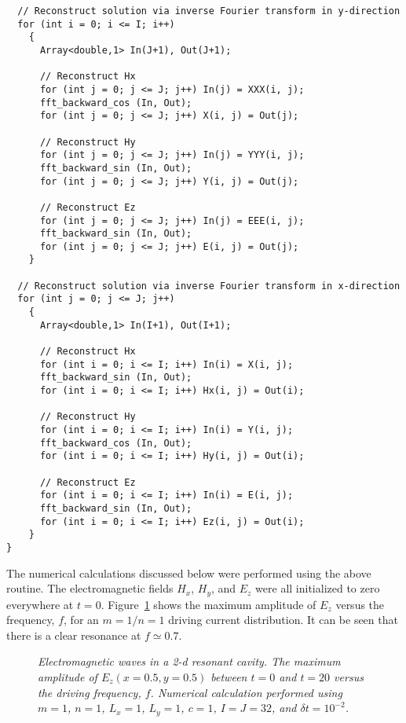 {\begin{verbatim}
  // Reconstruct solution via inverse Fourier transform in y-direction
  for (int i = 0; i <= I; i++)
    {
      Array<double,1> In(J+1), Out(J+1);

      // Reconstruct Hx
      for (int j = 0; j <= J; j++) In(j) = XXX(i, j);
      fft_backward_cos (In, Out);
      for (int j = 0; j <= J; j++) X(i, j) = Out(j);

      // Reconstruct Hy
      for (int j = 0; j <= J; j++) In(j) = YYY(i, j);
      fft_backward_sin (In, Out);
      for (int j = 0; j <= J; j++) Y(i, j) = Out(j);

      // Reconstruct Ez
      for (int j = 0; j <= J; j++) In(j) = EEE(i, j);
      fft_backward_sin (In, Out);
      for (int j = 0; j <= J; j++) E(i, j) = Out(j);
    } 

  // Reconstruct solution via inverse Fourier transform in x-direction
  for (int j = 0; j <= J; j++)
    {
      Array<double,1> In(I+1), Out(I+1);

      // Reconstruct Hx
      for (int i = 0; i <= I; i++) In(i) = X(i, j);
      fft_backward_sin (In, Out);
      for (int i = 0; i <= I; i++) Hx(i, j) = Out(i);

      // Reconstruct Hy
      for (int i = 0; i <= I; i++) In(i) = Y(i, j);
      fft_backward_cos (In, Out);
      for (int i = 0; i <= I; i++) Hy(i, j) = Out(i);

      // Reconstruct Ez
      for (int i = 0; i <= I; i++) In(i) = E(i, j);
      fft_backward_sin (In, Out);
      for (int i = 0; i <= I; i++) Ez(i, j) = Out(i);
    }
}
\end{verbatim}}

The numerical calculations discussed below were performed
using the above routine. The electromagnetic
fields $H_x$, $H_y$, and $E_z$ were all initialized to zero everywhere  at $t=0$.
 Figure~\ref{fcavity1} shows the maximum
amplitude of $E_z$ versus the frequency, $f$, for an $m=1/n=1$ driving
current distribution. It can
be seen that there is a clear resonance at $f\simeq 0.7$. 

\begin{figure}
\epsfysize=3in
\centerline{}
\caption{\em Electromagnetic waves in a 2-d resonant cavity.
The maximum amplitude of $E_z(x=0.5,y=0.5)$ between $t=0$ and $t=20$ versus the driving frequency, $f$.
Numerical calculation performed using  $m=1$, $n=1$, $L_x=1$, $L_y=1$, $c=1$,
$I=J=32$, and $\delta t = 10^{-2}$.}\label{fcavity1}
\end{figure}


